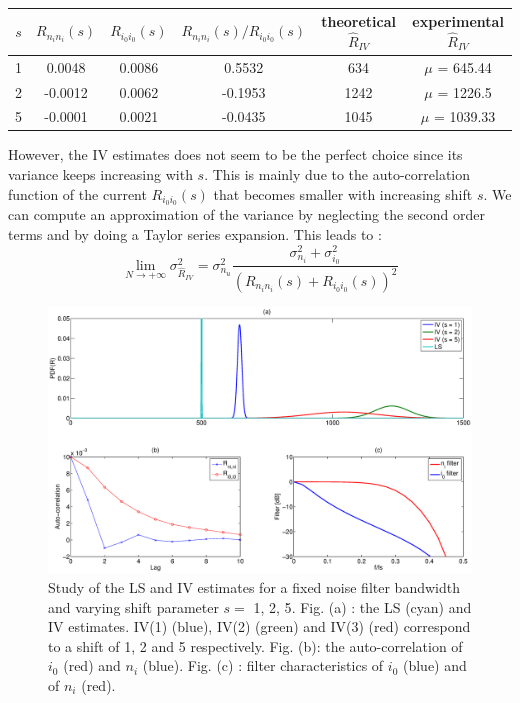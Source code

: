 \begin{table}[ht]
\centering
\begin{tabular}{|c|c|c|c|c|c|}
\hline
$s$ & $R_{n_i n_i}(s)$ & $R_{i_0 i_0}(s)$ & $R_{n_i n_i}(s)/R_{i_0 i_0}(s)$ & theoretical $\hat{R}_{IV}$ & experimental $\hat{R}_{IV}$ \\
\hline
\hline
1 & 0.0048 & 0.0086 & 0.5532 & 634 & $\mu$ = 645.44\\
\hline
2 & -0.0012 & 0.0062 & -0.1953 & 1242 & $\mu$ = 1226.5 \\
\hline
5 & -0.0001 & 0.0021 & -0.0435 & 1045 & $\mu$ = 1039.33 \\
\hline
\end{tabular}\caption{}\label{tab: Sess1_part1_exp2}
\end{table}
However, the IV estimates does not seem to be the perfect choice since its variance keeps increasing with $s$. This is mainly due to the auto-correlation function of the current $R_{i_0 i_0}(s)$  that becomes smaller with increasing shift $s$. We can compute an approximation of the variance by neglecting the second order terms and by doing a Taylor series expansion. This leads to :
\begin{equation}
\lim\limits_{N \rightarrow +\infty} \sigma^2_{\hat{R}_{IV}} = \sigma^2_{n_u} \frac{\sigma^2_{n_i}  + \sigma^2_{i_0}}{(R_{n_i n_i}(s) + R_{i_0 i_0}(s))^2}
\end{equation}


\begin{figure}[h!]
    \centering
    \includegraphics[width=1\textwidth]{Figures/Sess1_part1_exp2.eps}
    \caption{Study of the LS and IV estimates for a fixed noise filter bandwidth and varying shift parameter $s =$ {1, 2, 5}. Fig. (a) : the LS (cyan) and IV estimates. IV(1) (blue), IV(2) (green) and IV(3) (red) correspond to a shift of 1, 2 and 5 respectively. Fig. (b): the auto-correlation of $i_0$ (red) and $n_i$ (blue). Fig. (c) : filter characteristics of $i_0$ (blue) and of $n_i$ (red).}
    \label{fig: Sess1_part1_exp2}
\end{figure}
